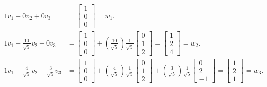 \documentclass[11pt,letterpaper]{article}
\begin{document}
\begin{align*}
    1v_1 + 0v_2 + 0v_3 &= \begin{bmatrix} 1\\0\\0 \end{bmatrix} = w_1.\\
    1v_1 + \frac{10}{\sqrt{5}}v_2 + 0v_3 &=\begin{bmatrix} 1\\0\\0 \end{bmatrix} + \left(\frac{10}{\sqrt{5}}\right)\frac{1}{\sqrt{5}}\begin{bmatrix} 0\\1\\2 \end{bmatrix}= \begin{bmatrix} 1\\2\\4 \end{bmatrix} = w_2.\\
    1v_1 + \frac{4}{\sqrt{5}}v_2 + \frac{3}{\sqrt{5}}v_3 &=\begin{bmatrix} 1\\0\\0 \end{bmatrix} + \left( \frac{4}{\sqrt{5}} \right)\frac{1}{\sqrt{5}}\begin{bmatrix} 0\\1\\2 \end{bmatrix} + \left( \frac{3}{\sqrt{5}} \right)\frac{1}{\sqrt{5}}\begin{bmatrix} 0\\2\\-1 \end{bmatrix} = \begin{bmatrix} 1\\2\\1 \end{bmatrix} = w_3.
\end{align*}
\end{document}
